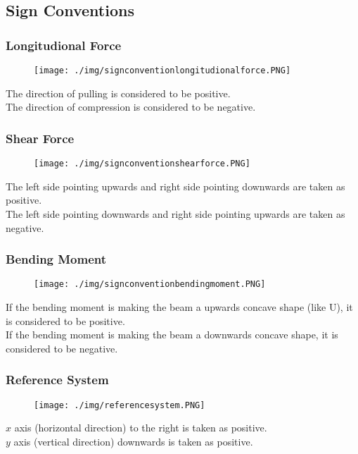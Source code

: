 \subsection{Sign Conventions}
\subsubsection{Longitudional Force}
\begin{figure}[H]
  \centering
  \texttt{[image: ./img/signconventionlongitudionalforce.PNG]}
\end{figure}
The direction of pulling is considered to be positive.\\
The direction of compression is considered to be negative.
\subsubsection{Shear Force}
\begin{figure}[H]
  \centering
  \texttt{[image: ./img/signconventionshearforce.PNG]}
\end{figure}
The left side pointing upwards and right side pointing downwards are taken as positive.\\
The left side pointing downwards and right side pointing upwards are taken as negative.
\subsubsection{Bending Moment}
\begin{figure}[H]
  \centering
  \texttt{[image: ./img/signconventionbendingmoment.PNG]}
\end{figure}
If the bending moment is making the beam a upwards concave shape (like U), it is considered to be positive. \\
If the bending moment is making the beam a downwards concave shape, it is considered to be negative.
\subsubsection{Reference System}
\begin{figure}[H]
  \centering
  \texttt{[image: ./img/referencesystem.PNG]}
\end{figure}
$x$ axis (horizontal direction) to the right is taken as positive. \\
$y$ axis (vertical direction) downwards is taken as positive.